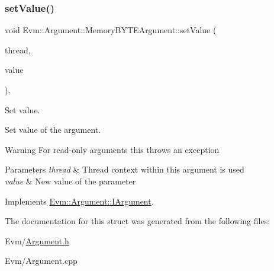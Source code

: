 \subsubsection{\texorpdfstring{set\+Value()}{setValue()}}
{\footnotesize\ttfamily void Evm\+::\+Argument\+::\+Memory\+B\+Y\+T\+E\+Argument\+::set\+Value (\begin{DoxyParamCaption}\item[{\mbox{\hyperlink{struct_evm_1_1_thread_context}{Thread\+Context}} \&}]{thread,  }\item[{uint64\+\_\+t}]{value }\end{DoxyParamCaption})\hspace{0.3cm}{\ttfamily [override]}, {\ttfamily [virtual]}}



Set value. 

Set value of the argument. \begin{DoxyWarning}{Warning}
For read-\/only arguments this throws an exception 
\end{DoxyWarning}

\begin{DoxyParams}{Parameters}
{\em thread} & Thread context within this argument is used \\
\hline
{\em value} & New value of the parameter \\
\hline
\end{DoxyParams}


Implements \mbox{\hyperlink{struct_evm_1_1_argument_1_1_i_argument_a24e4c76f2750e664e3895d2ff4b9146d}{Evm\+::\+Argument\+::\+I\+Argument}}.



The documentation for this struct was generated from the following files\+:\begin{DoxyCompactItemize}
\item 
Evm/\mbox{\hyperlink{_argument_8h}{Argument.\+h}}\item 
Evm/Argument.\+cpp\end{DoxyCompactItemize}
